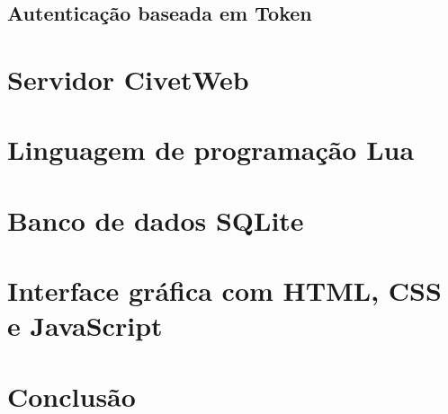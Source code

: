 \section{Autenticação baseada em Token}

\chapter{Servidor CivetWeb}

\chapter{Linguagem de programação Lua}

\chapter{Banco de dados SQLite}

\chapter{Interface gráfica com HTML, CSS e JavaScript}

\chapter{Conclusão}
